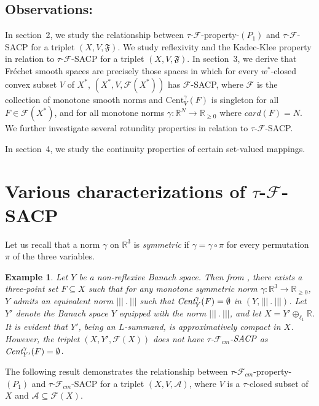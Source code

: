 \documentclass[11pt]{amsart}
\newtheorem{ex}[thm]{Example}
\newcommand{\ra}{\rightarrow}
\newcommand{\es}{\emptyset}
\newcommand{\ci}{\subseteq}
\newcommand{\ga}{\gamma}
\newcommand{\mb}{\mathbb}
\newcommand{\mc}{\mathcal}
\newcommand{\mf}{\mathfrak}
\newcommand{\mr}{\mathscr}
\newcommand{\trC}{\textrm{Cent}}
\newcommand{\emC}{\emph{Cent}}
\newcommand{\eSACP}{\bf{\emph{SACP}}}
\begin{document}
\subsection{Observations:~}  In section~2, we study the relationship between $\tau$-$\mr{F}$-property-$(P_1)$ and $\tau$-$\mr{F}$-SACP for a triplet $(X,V,\mf{F})$. We study reflexivity and the Kadec-Klee property in relation to $\tau$-$\mr{F}$-SACP for a triplet $(X,V,\mf{F})$. In section~3, we derive that Fr\'echet smooth spaces are precisely those spaces in which for every $w^*$-closed convex subset $V$ of $X^*$, $(X^*,V,\mc{F}(X^*))$ has $\mr{F}$-SACP, where $\mr{F}$ is the collection of monotone smooth norms and $\trC_V^\ga(F)$ is singleton for all $F\in\mc{F}(X^*)$, and for all monotone norms $\ga:\mb{R}^N\ra\mb{R}_{\geq0}$ where $card(F)=N$. We further investigate several rotundity properties in relation to $\tau$-$\mr{F}$-SACP. 

In section~4, we study the continuity properties of certain set-valued mappings.

\section{Various characterizations of $\tau$-$\mr{F}$-SACP}\hfill

Let us recall that a norm $\ga$ on $\mb{R}^3$ is {\it symmetric} if $\ga=\ga\circ\pi$ for every permutation $\pi$ of the three variables.
\begin{ex}\label{E3}
Let $Y$ be a non-reflexive Banach space. Then from \cite[Theorem~2.4]{LV}, there exists a three-point set $F\ci X$ such that for any monotone symmetric norm $\ga:\mb{R}^3\ra\mb{R}_{\geq0}$, $Y$ admits an equivalent norm $|||~.~|||$ such that $\emC_Y^\ga(F)=\es$ in $(Y,|||~.~|||)$. Let $Y'$ denote the Banach space $Y$ equipped with the norm $|||~.~|||$, and let $X=Y'\oplus_{\ell_1}\mb{R}$. It is evident that $Y'$, being an $L$-summand, is approximatively compact in $X$. However, the triplet $(X,Y',\mc{F}(X))$ does not have $\tau$-$\mr{F}_{cm}$-$\eSACP$ as $\emC_{Y'}^\ga(F)=\es$. 
\end{ex}

The following result demonstrates the relationship between $\tau$-$\mr{F}_{cm}$-property-$(P_1)$ and $\tau$-$\mr{F}_{cm}$-SACP for a triplet $(X,V,\mc{A})$, where $V$ is a $\tau$-closed subset of $X$ and $\mc{A}\ci\mc{F}(X)$.
\end{document}
